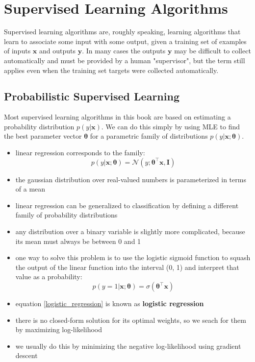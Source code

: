 \documentclass[11pt, twocolumn]{report}
\def\parameter{\bm{\theta}}
\begin{document}
\section{Supervised Learning Algorithms}
Supervised learning algorithms are, roughly speaking, learning algorithms that
learn to associate some input with some output, given a training set of
examples of inputs $\bm{x}$ and outputs $\bm{y}$. In many cases the outputs
$\bm{y}$ may be difficult to collect automatically and must be provided by a
human "supervisor", but the term still applies even when the training set
targets were collected automatically.

\subsection{Probabilistic Supervised Learning}
Most supervised learning algorithms in this book are based on estimating a
probability distribution $p(y | \bm{x})$. We can do this simply by using MLE to
find the best parameter vector $\parameter$ for a parametric family of
distributions $p(y | \bm{x};\parameter)$.
\begin{itemize}
  \item linear regression corresponds to the family:
    \begin{equation}
      p(y | \bm{x}; \parameter) = \mathcal{N}(y;\parameter^\intercal\bm{x},\bm{I})
    \end{equation}
  \item the gaussian distribution over real-valued numbers is parameterized in
    terms of a mean
  \item linear regression can be generalized to classification by defining a
    different family of probability distributions
  \item any distribution over a binary variable is slightly more complicated,
    because its mean must always be between 0 and 1
  \item one way to solve this problem is to use the logistic sigmoid function to
    squash the output of the linear function into the interval (0, 1) and
    interpret that value as a probability:
    \begin{equation}
      \label{logistic_regression}
      p(y = 1 | \bm{x}; \parameter) = \sigma(\parameter^\intercal\bm{x})
    \end{equation}
  \item equation \ref{logistic_regression} is known as \textbf{logistic
      regression}
  \item there is no closed-form solution for its optimal weights, so we seach
    for them by maximizing log-likelihood
  \item we usually do this by minimizing the negative log-likelihood using
    gradient descent
\end{itemize}
\end{document}
